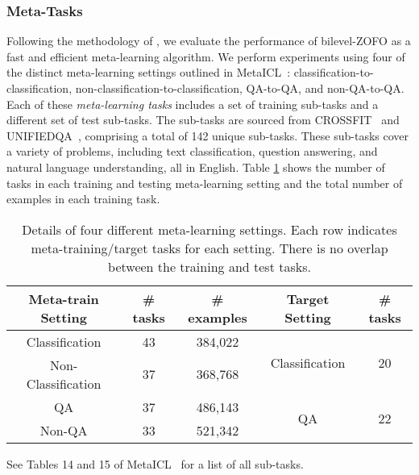 \subsubsection{Meta-Tasks}
Following the methodology of \citet{MinLZH22MetaICL}, we evaluate the performance of bilevel-ZOFO as a fast and efficient meta-learning algorithm. We perform experiments using four of the distinct meta-learning settings outlined in MetaICL~\citep{MinLZH22MetaICL}: classification-to-classification, non-classification-to-classification, QA-to-QA, and non-QA-to-QA. Each of these \emph{meta-learning tasks} includes a set of training sub-tasks and a different set of test sub-tasks. The sub-tasks are sourced from CROSSFIT~\citep{YeLR21CrossfitFewShot} and UNIFIEDQA~\citep{KhashabiMKSTCH20}, comprising a total of 142 unique sub-tasks. These sub-tasks cover a variety of problems, including text classification, question answering, and natural language understanding, all in English.  Table \ref{tab:meta-learning-tasks} shows the number of tasks in each training and testing meta-learning setting and the total number of examples in each training task.

\begin{table}[ht]
\centering
\begin{tabular}{ccccc}
\hline
\textbf{Meta-train Setting} & \textbf{\# tasks} & \textbf{\# examples} & \textbf{Target Setting} & \textbf{\# tasks} \\ 
\hline
Classification & 43 & 384,022 & \multirow{2}{*}{Classification} & \multirow{2}{*}{20} \\\cmidrule{1-3}
Non-Classification & 37 & 368,768 &  &  \\
\hline
QA & 37 & 486,143 & \multirow{2}{*}{QA} & \multirow{2}{*}{22} \\\cmidrule{1-3}
Non-QA & 33 & 521,342 &  &  \\
\hline
\end{tabular}
\caption{Details of four different meta-learning settings. Each row indicates meta-training/target tasks for each setting. There is no overlap between the training and test tasks.}
\label{tab:meta-learning-tasks}
\end{table}

See Tables 14 and 15 of MetaICL~\citep{MinLZH22MetaICL} for a list of all sub-tasks. 

